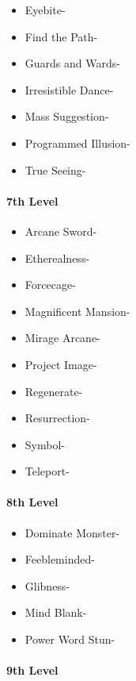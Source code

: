 \documentclass[
]{article}
\providecommand{\tightlist}{%
  \setlength{\itemsep}{0pt}\setlength{\parskip}{0pt}}
\begin{document}
\begin{itemize}
\tightlist
\item
  Eyebite-
\item
  Find the Path-
\item
  Guards and Wards-
\item
  Irresistible Dance-
\item
  Mass Suggestion-
\item
  Programmed Illusion-
\item
  True Seeing-
\end{itemize}

\hypertarget{7th-level}{%
\paragraph{7th Level}\label{7th-level}}

\begin{itemize}
\tightlist
\item
  Arcane Sword-
\item
  Etherealness-
\item
  Forcecage-
\item
  Magnificent Mansion-
\item
  Mirage Arcane-
\item
  Project Image-
\item
  Regenerate-
\item
  Resurrection-
\item
  Symbol-
\item
  Teleport-
\end{itemize}

\hypertarget{8th-level}{%
\paragraph{8th Level}\label{8th-level}}

\begin{itemize}
\tightlist
\item
  Dominate Monster-
\item
  Feebleminded-
\item
  Glibness-
\item
  Mind Blank-
\item
  Power Word Stun-
\end{itemize}

\hypertarget{9th-level}{%
\paragraph{9th Level}\label{9th-level}}
\end{document}

